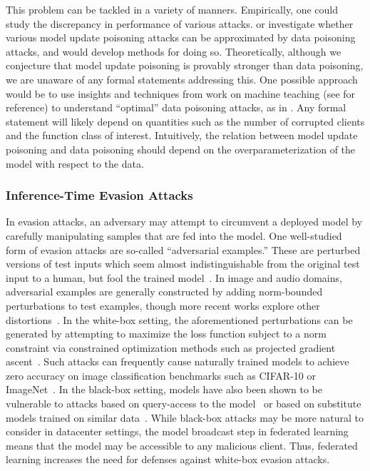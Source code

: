 \documentclass[11pt]{article}
\begin{document}
This problem can be tackled in a variety of manners. Empirically, one could study the discrepancy in performance of various attacks. or investigate whether various model update poisoning attacks can be approximated by data poisoning attacks, and would develop methods for doing so. Theoretically, although we conjecture that model update poisoning is provably stronger than data poisoning, we are unaware of any formal statements addressing this. One possible approach would be to use insights and techniques from work on machine teaching (see \citep{zhu2015machine} for reference) to understand ``optimal'' data poisoning attacks, as in \citep{mei2015using}. Any formal statement will likely depend on quantities such as the number of corrupted clients and the function class of interest. Intuitively, the relation between model update poisoning and data poisoning should depend on the overparameterization of the model with respect to the data.

\subsubsection{Inference-Time Evasion Attacks}
\label{subsubsec:inference_time_attacks}

In evasion attacks, an adversary may attempt to circumvent a deployed model by carefully manipulating samples that are fed into the model. One well-studied form of evasion attacks are so-called “adversarial examples.” These are perturbed versions of test inputs which seem almost indistinguishable from the original test input to a human, but fool the trained model~\citep{biggio2013evasion, szegedy2013intriguing}.
In image and audio domains, adversarial examples are generally constructed by adding norm-bounded perturbations to test examples, though more recent works explore other distortions~\citep{engstrom2017rotation, wong2019wasserstein, kang2019testing}.
In the white-box setting, the aforementioned perturbations can be generated by attempting to maximize the loss function subject to a norm constraint via constrained optimization methods such as projected gradient ascent~\citep{kurakin2016adversarial, madry2017towards}. 
Such attacks can frequently cause naturally trained models to achieve zero accuracy on image classification benchmarks such as CIFAR-10 or ImageNet~\citep{carlini2017towards}. 
In the black-box setting, models have also been shown to be vulnerable to attacks based on query-access to the model~\citep{chen2017zoo, brendel2017decision} or based on substitute models trained on similar data~\cite{szegedy2013intriguing, papernot2017practical, DBLP:conf/iclr/TramerKPGBM18}. While black-box attacks may be more natural to consider in datacenter settings, the model broadcast step in federated learning means that the model may be accessible to any malicious client. Thus, federated learning increases the need for defenses against white-box evasion attacks.
\end{document}
